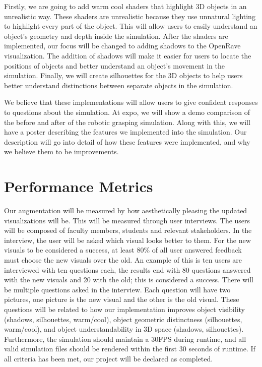\documentclass[10pt,journal,compsoc]{IEEEtran}
\begin{document}
Firstly, we are going to add warm cool shaders that highlight 3D objects in an unrealistic way. 
These shaders are unrealistic because they use unnatural lighting to highlight every part of the object. 
This will allow users to easily understand an object's geometry and depth inside the simulation.
After the shaders are implemented, our focus will be changed to adding shadows to the OpenRave visualization. 
The addition of shadows will make it easier for users to locate the positions of objects and better understand an object's movement in the simulation. 
Finally, we will create silhouettes for the 3D objects to help users better understand distinctions between separate objects in the simulation. \par

We believe that these implementations will allow users to give confident responses to questions about the simulation.
At expo, we will show a demo comparison of the before and after of the robotic grasping simulation. 
Along with this, we will have a poster describing the features we implemented into the simulation. 
Our description will go into detail of how these features were implemented, and why we believe them to be improvements.

\section{Performance Metrics}
Our augmentation will be measured by how aesthetically pleasing the updated visualizations will be.
This will be measured through user interviews.
The users will be composed of faculty members, students and relevant stakeholders.
In the interview, the user will be asked which visual looks better to them.
For the new visuals to be considered a success, at least 80\% of all user answered feedback must choose the new visuals over the old. 
An example of this is ten users are interviewed with ten questions each, the results end with 80 questions answered with the new visuals and 20 with the old; this is considered a success.
There will be multiple questions asked in the interview.
Each question will have two pictures, one picture is the new visual and the other is the old visual.
These questions will be related to how our implementation improves object visibility (shadows, silhouettes, warm/cool), object geometric distinctness (silhouettes, warm/cool), and object understandability in 3D space (shadows, silhouettes).
Furthermore, the simulation should maintain a 30FPS during runtime, and all valid simulation files should be rendered within the first 30 seconds of runtime.
If all criteria has been met, our project will be declared as completed.
\end{document}
